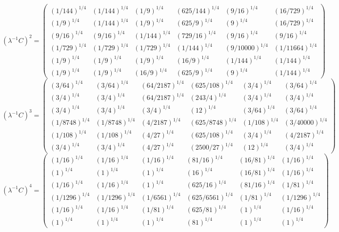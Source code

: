 $$(\lambda^{-1}C)^2 = \begin{pmatrix}
(1/144)^{1/4} & (1/144)^{1/4} & (1/9)^{1/4} & (625/144)^{1/4} & (9/16)^{1/4} & (16/729)^{1/4}\\
(1/9)^{1/4} & (1/144)^{1/4} & (1/9)^{1/4} & (625/9)^{1/4} & (9)^{1/4} & (16/729)^{1/4}\\
(9/16)^{1/4} & (9/16)^{1/4} & (1/144)^{1/4} & (729/16)^{1/4} & (9/16)^{1/4} & (9/16)^{1/4}\\
(1/729)^{1/4} & (1/729)^{1/4} & (1/729)^{1/4} & (1/144)^{1/4} & (9/10000)^{1/4} & (1/11664)^{1/4}\\
(1/9)^{1/4} & (1/9)^{1/4} & (1/9)^{1/4} & (16/9)^{1/4} & (1/144)^{1/4} & (1/144)^{1/4}\\
(1/9)^{1/4} & (1/9)^{1/4} & (16/9)^{1/4} & (625/9)^{1/4} & (9)^{1/4} & (1/144)^{1/4}
\end{pmatrix}
$$
$$(\lambda^{-1}C)^3 = \begin{pmatrix}
(3/64)^{1/4} & (3/64)^{1/4} & (64/2187)^{1/4} & (625/108)^{1/4} & (3/4)^{1/4} & (3/64)^{1/4}\\
(3/4)^{1/4} & (3/4)^{1/4} & (64/2187)^{1/4} & (243/4)^{1/4} & (3/4)^{1/4} & (3/4)^{1/4}\\
(3/4)^{1/4} & (3/4)^{1/4} & (3/4)^{1/4} & (12)^{1/4} & (3/64)^{1/4} & (3/64)^{1/4}\\
(1/8748)^{1/4} & (1/8748)^{1/4} & (4/2187)^{1/4} & (625/8748)^{1/4} & (1/108)^{1/4} & (3/40000)^{1/4}\\
(1/108)^{1/4} & (1/108)^{1/4} & (4/27)^{1/4} & (625/108)^{1/4} & (3/4)^{1/4} & (4/2187)^{1/4}\\
(3/4)^{1/4} & (3/4)^{1/4} & (4/27)^{1/4} & (2500/27)^{1/4} & (12)^{1/4} & (3/4)^{1/4}
\end{pmatrix}
$$
$$(\lambda^{-1}C)^4 = \begin{pmatrix}
(1/16)^{1/4} & (1/16)^{1/4} & (1/16)^{1/4} & (81/16)^{1/4} & (16/81)^{1/4} & (1/16)^{1/4}\\
(1)^{1/4} & (1)^{1/4} & (1)^{1/4} & (16)^{1/4} & (16/81)^{1/4} & (1/16)^{1/4}\\
(1/16)^{1/4} & (1/16)^{1/4} & (1)^{1/4} & (625/16)^{1/4} & (81/16)^{1/4} & (1/81)^{1/4}\\
(1/1296)^{1/4} & (1/1296)^{1/4} & (1/6561)^{1/4} & (625/6561)^{1/4} & (1/81)^{1/4} & (1/1296)^{1/4}\\
(1/16)^{1/4} & (1/16)^{1/4} & (1/81)^{1/4} & (625/81)^{1/4} & (1)^{1/4} & (1/16)^{1/4}\\
(1)^{1/4} & (1)^{1/4} & (1)^{1/4} & (81)^{1/4} & (1)^{1/4} & (1)^{1/4}
\end{pmatrix}
$$
